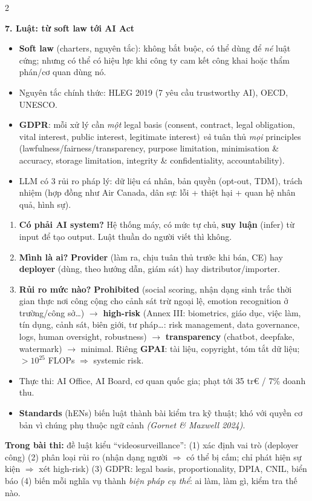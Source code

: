 \documentclass[10pt]{article}
\newcommand{\kw}[1]{\textbf{#1}}
\newcommand{\ct}[1]{{\color{h1}\itshape(#1)}}
\newcommand{\sect}[1]{\par\vspace{6pt}\noindent\colorbox{h1}{\parbox{\dimexpr\linewidth-2\fboxsep}{\large\bfseries\color{white}#1}}\par\vspace{2pt}}
\newcommand{\sub}[1]{\par\vspace{3pt}{\bfseries\color{h2}#1}\par}
\newcommand{\warn}[1]{\par\noindent\colorbox{wn}{\parbox{\dimexpr\linewidth-2\fboxsep}{\textbf{Trong bài thi:} #1}}\par}
\begin{document}
\begin{multicols}{2}
\sect{7. Luật: từ soft law tới AI Act}
\begin{itemize}
\item \kw{Soft law} (charters, nguyên tắc): không bắt buộc, có thể dùng để \emph{né} luật cứng; nhưng có thể có hiệu lực khi công ty cam kết công khai hoặc thẩm phán/cơ quan dùng nó.
\item Nguyên tắc chính thức: HLEG 2019 (7 yêu cầu trustworthy AI), OECD, UNESCO.
\item \kw{GDPR}: mỗi xử lý cần \emph{một} legal basis (consent, contract, legal obligation, vital interest, public interest, legitimate interest) \emph{và} tuân thủ \emph{mọi} principles (lawfulness/fairness/transparency, purpose limitation, minimisation \& accuracy, storage limitation, integrity \& confidentiality, accountability).
\item LLM có 3 rủi ro pháp lý: dữ liệu cá nhân, bản quyền (opt-out, TDM), trách nhiệm (hợp đồng như Air Canada, dân sự: lỗi + thiệt hại + quan hệ nhân quả, hình sự).
\end{itemize}
\sub{AI Act -- đọc theo 3 câu hỏi}
\begin{enumerate}
\item \textbf{Có phải AI system?} Hệ thống máy, có mức tự chủ, \kw{suy luận} (infer) từ input để tạo output. Luật thuần do người viết thì không.
\item \textbf{Mình là ai?} \kw{Provider} (làm ra, chịu tuân thủ trước khi bán, CE) hay \kw{deployer} (dùng, theo hướng dẫn, giám sát) hay distributor/importer.
\item \textbf{Rủi ro mức nào?} \kw{Prohibited} (social scoring, nhận dạng sinh trắc thời gian thực nơi công cộng cho cảnh sát trừ ngoại lệ, emotion recognition ở trường/công sở\ldots) $\to$ \kw{high-risk} (Annex III: biometrics, giáo dục, việc làm, tín dụng, cảnh sát, biên giới, tư pháp\ldots: risk management, data governance, logs, human oversight, robustness) $\to$ \kw{transparency} (chatbot, deepfake, watermark) $\to$ minimal. Riêng \kw{GPAI}: tài liệu, copyright, tóm tắt dữ liệu; $>10^{25}$ FLOPs $\Rightarrow$ systemic risk.
\end{enumerate}
\begin{itemize}
\item Thực thi: AI Office, AI Board, cơ quan quốc gia; phạt tới 35 tr€ / 7\% doanh thu.
\item \kw{Standards} (hENs) biến luật thành bài kiểm tra kỹ thuật; khó với quyền cơ bản vì chúng phụ thuộc ngữ cảnh \ct{Gornet \& Maxwell 2024}.
\end{itemize}
\warn{đề luật kiểu ``videosurveillance'': (1) xác định vai trò (deployer công) (2) phân loại rủi ro (nhận dạng người $\Rightarrow$ có thể bị cấm; chỉ phát hiện sự kiện $\Rightarrow$ xét high-risk) (3) GDPR: legal basis, proportionality, DPIA, CNIL, biển báo (4) biến mỗi nghĩa vụ thành \emph{biện pháp cụ thể}: ai làm, làm gì, kiểm tra thế nào.}


\end{multicols}
\end{document}
